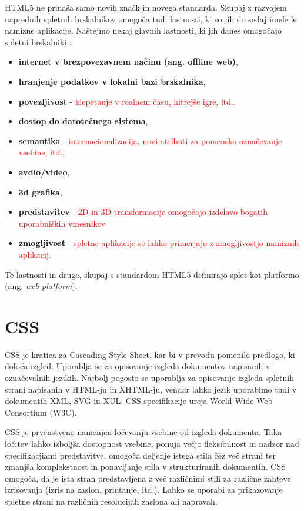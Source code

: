 \documentclass[a4paper, 12pt]{book}
\begin{document}
HTML5 ne prina\v sa samo novih zna\v ck in novega standarda. Skupaj z razvojem naprednih spletnih brskalnikov omogo\v ca tudi lastnosti, ki so jih do sedaj imele le namizne aplikacije. Na\v stejmo nekaj glavnih lastnosti, ki jih danes omogo\v cajo spletni brskalniki
\cite{html5rocks}:

\begin{itemize}
\item \textbf{internet v brezpovezavnem na\v cinu (ang. offline web)},
\item \textbf{hranjenje podatkov v lokalni bazi brskalnika},
\item \textbf{povezljivost} - \textcolor{red}{klepetanje v realnem \v casu, hitrej\v se igre, itd.,}
\item \textbf{dostop do datote\v cnega sistema},
\item \textbf{semantika} - \textcolor{red}{internacionalizacija, novi atributi za pomensko ozna\v cevanje vsebine, itd.,}
\item \textbf{avdio/video},
\item \textbf{3d grafika},
\item \textbf{predstavitev} - \textcolor{red}{2D in 3D transformacije omogo\v cajo izdelavo bogatih uporabni\v skih vmesnikov}
\item \textbf{zmogljivost} - \textcolor{red}{spletne aplikacije se lahko primerjajo z zmogljivostjo namiznih aplikacij.}
\end{itemize}

Te lastnosti in druge, skupaj s standardom HTML5 definirajo splet kot platformo (ang. \textit{web platform}).

\section{CSS}
CSS je kratica za Cascading Style Sheet, kar bi v prevodu pomenilo predlogo, ki dolo\v ca izgled. Uporablja se za opisovanje izgleda dokumentov napisanih v ozna\v cevalnih jezikih. Najbolj pogosto se uporablja za opisovanje izgleda spletnih strani napisanih v HTML-ju in XHTML-ju, vendar lahko jezik uporabimo tudi v dokumentih XML, SVG in XUL. CSS specifikacije ureja World Wide Web Consortium (W3C).

CSS je prvenstveno namenjen lo\v cevanju vsebine od izgleda dokumenta. Taka lo\v citev lahko izbolj\v sa dostopnost vsebine, ponuja ve\v cjo fleksibilnost in nadzor nad specifikacjiami predstavitve, omogo\v ca deljenje istega stila \v cez ve\v c strani ter zmanj\v sa komplekstnost in ponavljanje stila v strukturiranih dokumentih. CSS omogo\v ca, da je ista stran predstavljena z ve\v c razli\v cnimi stili za razli\v cne zahteve izrisovanja (izris na zaslon, printanje, itd.). Lahko se uporabi za prikazovanje spletne strani na razli\v cnih resolucijah zaslona ali napravah.
\end{document}

